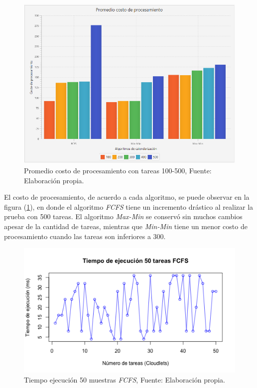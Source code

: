\setcounter{figure}{18}
\renewcommand\thefigure{\arabic{figure}}
\begin{figure}[h!] 
	\centering
	\includegraphics[scale=0.5]{media/costoproce}
	\caption{Promedio costo de procesamiento con tareas 100-500, Fuente: Elaboraci\'on propia.}
	\label{fig:costo}
\end{figure}


El costo de procesamiento, de acuerdo a cada algoritmo, se puede observar en la figura (\ref{fig:costo}), en donde el algoritmo \textit{FCFS} tiene un incremento dr\'astico al realizar la prueba con 500 tareas. El algoritmo \textit{Max-Min} se conserv\'o sin muchos cambios apesar de la cantidad de tareas, mientras que \textit{Min-Min} tiene un menor costo de procesamiento cuando las tareas son inferiores a 300.
\label{etiqueta2}
\newpage

\setcounter{figure}{19}
\renewcommand\thefigure{\arabic{figure}}
\begin{figure}[h!] 
	\centering
	\includegraphics[scale=0.6]{media/fcfs}
	\caption{Tiempo ejecuci\'on 50 muestras \textit{FCFS}, Fuente: Elaboraci\'on propia.}
	\label{fig:ejecucion}
\end{figure}


